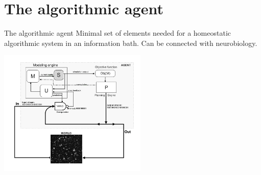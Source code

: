 \section{The algorithmic agent}

\begin{frame}[label=ladila]{The algorithmic agent}
Minimal set of elements needed for a homeostatic algorithmic system in an information bath. Can be connected with neurobiology.
 \begin{center}
  \includegraphics[height=6cm]{img/agent.png}
  \end{center}

\end{frame}



